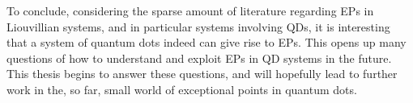 \documentclass[../main.tex]{subfiles}
\begin{document}
To conclude, considering the sparse amount of literature regarding EPs in Liouvillian systems, and in particular systems involving QDs, it is interesting that a system of quantum dots indeed can give rise to EPs. This opens up many questions of how to understand and exploit EPs in QD systems in the future. This thesis begins to answer these questions, and will hopefully lead to further work in the, so far, small world of exceptional points in quantum dots.
\end{document}
